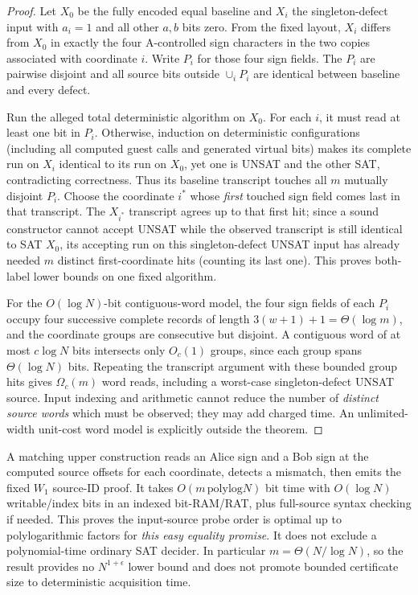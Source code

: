\documentclass[11pt]{article}
\begin{document}
\begin{proof}
Let $X_0$ be the fully encoded equal baseline and $X_i$ the singleton-defect input with $a_i=1$ and all other $a,b$ bits zero. From the fixed layout, $X_i$ differs from $X_0$ in exactly the four A-controlled sign characters in the two copies associated with coordinate $i$. Write $P_i$ for those four sign fields. The $P_i$ are pairwise disjoint and all source bits outside $\cup_iP_i$ are identical between baseline and every defect.

Run the alleged total deterministic algorithm on $X_0$. For each $i$, it must read at least one bit in $P_i$. Otherwise, induction on deterministic configurations (including all computed guest calls and generated virtual bits) makes its complete run on $X_i$ identical to its run on $X_0$, yet one is UNSAT and the other SAT, contradicting correctness. Thus its baseline transcript touches all $m$ mutually disjoint $P_i$. Choose the coordinate $i^*$ whose \emph{first} touched sign field comes last in that transcript. The $X_{i^*}$ transcript agrees up to that first hit; since a sound constructor cannot accept UNSAT while the observed transcript is still identical to SAT $X_0$, its accepting run on this singleton-defect UNSAT input has already needed $m$ distinct first-coordinate hits (counting its last one). This proves both-label lower bounds on one fixed algorithm.

For the $O(\log N)$-bit contiguous-word model, the four sign fields of each $P_i$ occupy four successive complete records of length $3(w+1)+1=\Theta(\log m)$, and the coordinate groups are consecutive but disjoint. A contiguous word of at most $c\log N$ bits intersects only $O_c(1)$ groups, since each group spans $\Theta(\log N)$ bits. Repeating the transcript argument with these bounded group hits gives $\Omega_c(m)$ word reads, including a worst-case singleton-defect UNSAT source. Input indexing and arithmetic cannot reduce the number of \emph{distinct source words} which must be observed; they may add charged time. An unlimited-width unit-cost word model is explicitly outside the theorem.
\end{proof}

A matching upper construction reads an Alice sign and a Bob sign at the computed source offsets for each coordinate, detects a mismatch, then emits the fixed $W_1$ source-ID proof. It takes $O(m\,\mathrm{polylog}N)$ bit time with $O(\log N)$ writable/index bits in an indexed bit-RAM/RAT, plus full-source syntax checking if needed. This proves the input-source probe order is optimal up to polylogarithmic factors for \emph{this easy equality promise}. It does not exclude a polynomial-time ordinary SAT decider. In particular $m=\Theta(N/\log N)$, so the result provides no $N^{1+\epsilon}$ lower bound and does not promote bounded certificate size to deterministic acquisition time.
\end{document}
